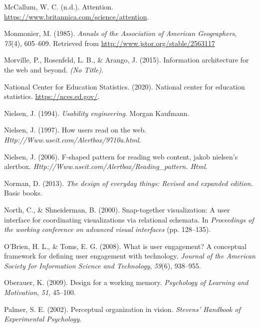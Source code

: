 \documentclass[print]{nuthesis}
\newlength{\cslhangindent}
\newenvironment{CSLReferences}[2]%
{\setlength{\parindent}{0pt}%
\everypar{\setlength{\hangindent}{\cslhangindent}}\ignorespaces}%
{\par}
\begin{document}
\begin{CSLReferences}{1}{0}
\leavevmode{}%
McCallum, W. C. (n.d.). Attention. \url{https://www.britannica.com/science/attention}.

\leavevmode{}%
Monmonier, M. (1985). \emph{Annals of the Association of American Geographers}, \emph{75}(4), 605--609. Retrieved from \url{http://www.jstor.org/stable/2563117}

\leavevmode{}%
Morville, P., Rosenfeld, L. B., \& Arango, J. (2015). Information architecture for the web and beyond. \emph{(No Title)}.

\leavevmode{}%
National Center for Education Statistics. (2020). National center for education statistics. \url{https://nces.ed.gov/}.

\leavevmode{}%
Nielsen, J. (1994). \emph{Usability engineering}. Morgan Kaufmann.

\leavevmode{}%
Nielsen, J. (1997). How users read on the web. \emph{Http://Www.useit.com/Alertbox/9710a.html}.

\leavevmode{}%
Nielsen, J. (2006). F-shaped pattern for reading web content, jakob nielsen's alertbox. \emph{Http://Www.useit.com/Alertbox/Reading\_pattern. Html}.

\leavevmode{}%
Norman, D. (2013). \emph{The design of everyday things: Revised and expanded edition}. Basic books.

\leavevmode{}%
North, C., \& Shneiderman, B. (2000). Snap-together visualization: A user interface for coordinating visualizations via relational schemata. In \emph{Proceedings of the working conference on advanced visual interfaces} (pp. 128--135).

\leavevmode{}%
O'Brien, H. L., \& Toms, E. G. (2008). What is user engagement? A conceptual framework for defining user engagement with technology. \emph{Journal of the American Society for Information Science and Technology}, \emph{59}(6), 938--955.

\leavevmode{}%
Oberauer, K. (2009). Design for a working memory. \emph{Psychology of Learning and Motivation}, \emph{51}, 45--100.

\leavevmode{}%
Palmer, S. E. (2002). Perceptual organization in vision. \emph{Stevens' Handbook of Experimental Psychology}.


\end{CSLReferences}
\end{document}

